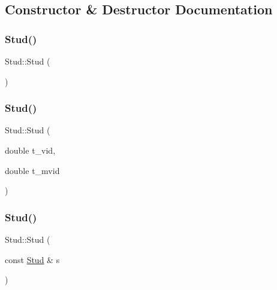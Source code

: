 \subsection{Constructor \& Destructor Documentation}
\mbox{\label{class_stud_a97585839898d45dc9fc815d5b36e2b69}} 
\subsubsection{\texorpdfstring{Stud()}{Stud()}\hspace{0.1cm}{\footnotesize\ttfamily [1/4]}}
{\footnotesize\ttfamily Stud\+::\+Stud (\begin{DoxyParamCaption}{ }\end{DoxyParamCaption})\hspace{0.3cm}{\ttfamily [inline]}}

\mbox{\label{class_stud_a5122947446a7abaaba3e6538faa43db1}} 
\subsubsection{\texorpdfstring{Stud()}{Stud()}\hspace{0.1cm}{\footnotesize\ttfamily [2/4]}}
{\footnotesize\ttfamily Stud\+::\+Stud (\begin{DoxyParamCaption}\item[{double}]{t\+\_\+vid,  }\item[{double}]{t\+\_\+mvid }\end{DoxyParamCaption})\hspace{0.3cm}{\ttfamily [inline]}}

\mbox{\label{class_stud_a7115844e12dadad25b9ff2de597f9eac}} 
\subsubsection{\texorpdfstring{Stud()}{Stud()}\hspace{0.1cm}{\footnotesize\ttfamily [3/4]}}
{\footnotesize\ttfamily Stud\+::\+Stud (\begin{DoxyParamCaption}\item[{const \mbox{\hyperlink{class_stud}{Stud}} \&}]{s }\end{DoxyParamCaption})}

